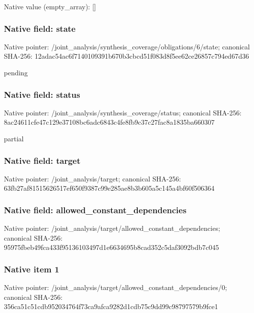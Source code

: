 \documentclass[10pt,a4paper]{article}
\begin{document}
Native value (empty\_\allowbreak{}array): []

\subsubsection{Native field: state}
Native pointer: /joint\_\allowbreak{}analysis/synthesis\_\allowbreak{}coverage/obligations/6/state; canonical SHA-256: 12adac54ac6f7140109391b670b3cbcd51f083d8f5ee62ce26857c794ed67d36

\begingroup\raggedright\sloppy pending\par\endgroup

\subsubsection{Native field: status}
Native pointer: /joint\_\allowbreak{}analysis/synthesis\_\allowbreak{}coverage/status; canonical SHA-256: 8ac24611cfe47c129e37108bc6adc6843c4fe8fb9c37c27fac8a1835ba660307

\begingroup\raggedright\sloppy partial\par\endgroup

\subsubsection{Native field: target}
Native pointer: /joint\_\allowbreak{}analysis/target; canonical SHA-256: 63fb27af81515626517ef650f9387c99e285ae8b3b605a5c145a4bf60f506364

\subsubsection{Native field: allowed\_\allowbreak{}constant\_\allowbreak{}dependencies}
Native pointer: /joint\_\allowbreak{}analysis/target/allowed\_\allowbreak{}constant\_\allowbreak{}dependencies; canonical SHA-256: 95975fbeb49fca433f95136103497d1e6634695b8cad352c5daf3092bdb7c045

\subsubsection{Native item 1}
Native pointer: /joint\_\allowbreak{}analysis/target/allowed\_\allowbreak{}constant\_\allowbreak{}dependencies/0; canonical SHA-256: 356ca51c51cdb952034764f73ca9afca9282d1cdb75c9dd99c98797579b9fce1
\end{document}
